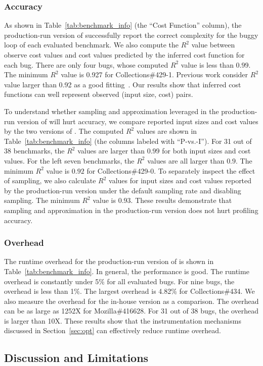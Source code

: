 \subsubsection{Accuracy}
As shown in Table~\ref{tab:benchmark_info} (the ``Cost Function'' column),
the production-run version of \Tool successfully 
report the correct complexity for the buggy loop of 
each evaluated benchmark. 
We also compute the $R^2$ value between observe cost values and 
cost values predicted by the inferred cost function for each bug.  
There are only four bugs, whose computed $R^2$ value is less than $0.99$.
The minimum $R^2$ value is 0.927 for Collections\#429-1. 
Previous work consider $R^2$ value larger than 0.92 
as a good fitting~\cite{rsquare-value}.
Our results show that inferred cost functions can well represent 
observed (input size, cost) pairs. 

To understand whether sampling and approximation leveraged 
in the production-run version of \Tool will hurt accuracy, 
we compare reported input sizes and cost values by the two versions of \Tool.
The computed $R^2$ values are shown in Table~\ref{tab:benchmark_info} 
(the columns labeled with ``P-vs.-I''). 
For 31 out of 38 benchmarks, 
the $R^2$ values are larger than $0.99$ for both input sizes and cost values. 
For the left seven benchmarks, the $R^2$ values are all larger than $0.9$.
The minimum $R^2$ value is $0.92$ for Collections\#429-0. 
To separately inspect the effect of sampling, 
we also calculate $R^2$ values for input sizes and cost values reported 
by the production-run version under the default sampling rate and disabling sampling. 
The minimum $R^2$ value is $0.93$. 
These results demonstrate that sampling and approximation in the production-run 
version does not hurt profiling accuracy. 


\subsubsection{Overhead}
The runtime overhead for the production-run version of \Tool is 
shown in Table~\ref{tab:benchmark_info}. 
In general, the performance is good. The runtime overhead is constantly 
under 5\% for all evaluated bugs. 
For nine bugs, the overhead is less than 1\%. 
The largest overhead is 4.82\% for Collections\#434. 
We also measure the overhead for the in-house version as a comparison. 
The overhead can be as large as 1252X for Mozilla\#416628.
For 31 out of 38 bugs, the overhead is larger than 10X. 
These results show that the instrumentation mechanisms 
discussed in Section~\ref{sec:opt} can effectively reduce runtime overhead. 


\subsection{Discussion and Limitations}


